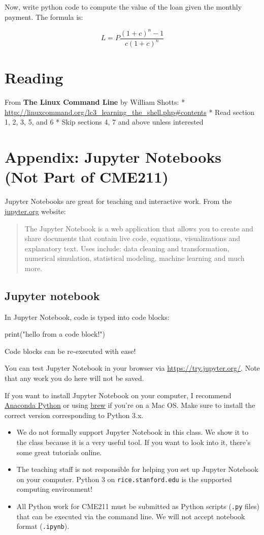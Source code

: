 \documentclass[12pt,letterpaper,twoside]{article}
\begin{document}
Now, write python code to compute the value of the loan given the
monthly payment. The formula is:

\[
L = P \frac{(1+c)^n-1}{c(1+c)^n}
\]

\section{Reading}
From \textbf{The Linux Command Line} by William Shotts: *
\url{http://linuxcommand.org/lc3_learning_the_shell.php\#contents} *
Read section 1, 2, 3, 5, and 6 * Skip sections 4, 7 and above unless
interested

\section{Appendix: Jupyter Notebooks (Not Part of CME211)}
Jupyter Notebooks are great for teaching and interactive work. From the
\href{http://jupyter.org/}{jupyter.org} website:

\begin{quote}
The Jupyter Notebook is a web application that allows you to create and
share documents that contain live code, equations, visualizations and
explanatory text. Uses include: data cleaning and transformation,
numerical simulation, statistical modeling, machine learning and much
more.
\end{quote}

\subsection{Jupyter notebook}
In Jupyter Notebook, code is typed into code blocks:

\begin{python}
print("hello from a code block!")
\end{python}

Code blocks can be re-executed with ease!

You can test Jupyter Notebook in your browser via
\url{https://try.jupyter.org/}. Note that any work you do here will not
be saved.

If you want to install Jupyter Notebook on your computer, I recommend
\href{https://www.continuum.io/downloads}{Anaconda Python} or using 
\href{https://brew.sh/}{brew} if you're on a Mac OS. Make sure to
install the correct version corresponding to Python 3.x.

\begin{itemize}
\item
  We do not formally support Jupyter Notebook in this class. We show it to the class
  because it is a very useful tool. If you want to look into it,
  there's some great tutorials online.
\item
  The teaching staff is not responsible for helping you set up Jupyter
  Notebook on your computer. Python 3 on \texttt{rice.stanford.edu} is
  the supported computing environment!
\item
  All Python work for CME211 must be submitted as Python scripts
  (\texttt{.py} files) that can be executed via the command line. We
  will not accept notebook format (\texttt{.ipynb}).
\end{itemize}
\end{document}
